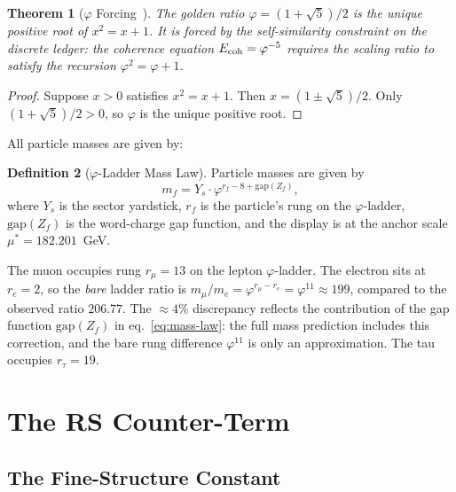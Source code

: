 \documentclass[12pt,a4paper]{article}
\newtheorem{theorem}{Theorem}[section]
\theoremstyle{definition}
\newtheorem{definition}[theorem]{Definition}
\theoremstyle{remark}
\begin{document}
\begin{theorem}[$\varphi$ Forcing~\cite{RS_Axioms}]
\label{thm:phi}
The golden ratio $\varphi = (1+\sqrt{5})/2$ is the unique positive root of
$x^2 = x + 1$.  It is forced by the self-similarity constraint on the
discrete ledger: the coherence equation $E_{\rm coh} = \varphi^{-5}$ requires
the scaling ratio to satisfy the recursion $\varphi^2 = \varphi + 1$.
\end{theorem}

\begin{proof}
Suppose $x > 0$ satisfies $x^2 = x + 1$.  Then $x = (1 \pm \sqrt{5})/2$.
Only $(1+\sqrt{5})/2 > 0$, so $\varphi$ is the unique positive root.
\end{proof}

\noindent All particle masses are given by:

\begin{definition}[$\varphi$-Ladder Mass Law]
Particle masses are given by
\begin{equation}
  m_f = Y_s \cdot \varphi^{r_f - 8 + \mathrm{gap}(Z_f)},
  \label{eq:mass-law}
\end{equation}
where $Y_s$ is the sector yardstick, $r_f$ is the particle's rung on
the $\varphi$-ladder, $\mathrm{gap}(Z_f)$ is the word-charge gap function,
and the display is at the anchor scale $\mu^* = 182.201$~GeV.
\end{definition}

The muon occupies rung $r_\mu = 13$ on the lepton $\varphi$-ladder.
The electron sits at $r_e = 2$, so the \emph{bare} ladder ratio is
$m_\mu/m_e = \varphi^{r_\mu - r_e} = \varphi^{11} \approx 199$,
compared to the observed ratio $206.77$.  The $\approx 4\%$ discrepancy
reflects the contribution of the gap function $\mathrm{gap}(Z_f)$ in
eq.~\eqref{eq:mass-law}: the full mass prediction includes this
correction, and the bare rung difference $\varphi^{11}$ is only an
approximation.  The tau occupies $r_\tau = 19$.

\section{The RS Counter-Term}
\label{sec:counterterm}

\subsection{The Fine-Structure Constant}
\end{document}
